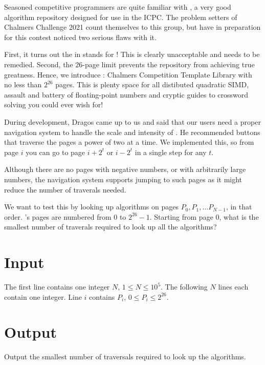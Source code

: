 Seasoned competitive programmers are quite familiar with , a very good algorithm repository
designed for use in the ICPC. The problem setters of Chalmers Challenge 2021 count themselves to
this group, but have in preparation for this contest noticed two serious flaws with it.

First, it turns out the  in  stands for ! This is clearly
unacceptable and needs to be remedied. Second, the $26$-page limit prevents the repository from
achieving true greatness. Hence, we introduce : Chalmers Competition Template Library
with no less than $2^26$ pages. This is plenty space for all distibuted quadratic SIMD, assault and
battery of floating-point numbers and cryptic guides to crossword solving you could ever wish for!

During development, Dragos came up to us and said that our users need a proper navigation system to
handle the scale and intensity of . He recommended buttons that traverse the pages a
power of two at a time. We implemented this, so from page $i$ you can go to page $i + 2^t$ or $i -
2^t$ in a single step for any $t$.

Although there are no pages with negative numbers, or with arbitrarily large numbers, the navigation
system supports jumping to such pages as it might reduce the number of traverals needed.

We want to test this by looking up algorithms on pages $P_0, P_1, \ldots P_{N-1}$, in that order.
's pages are numbered from $0$ to $2^26 - 1$. Starting from page $0$, what is the
smallest number of traverals required to look up all the algorithms?

\section*{Input}
The first line contains one integer $N$, $1 \le N \le 10^5$. The following $N$ lines each contain
one integer. Line $i$ contains $P_i$, $0 \le P_i \le 2^26$.

\section*{Output}
Output the smallest number of traversals required to look up the algorithms.
